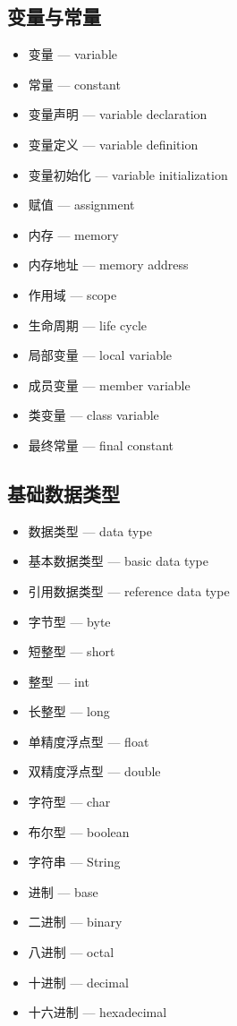 \subsection{变量与常量}
\begin{itemize}
\item 变量 — variable
\item 常量 — constant
\item 变量声明 — variable declaration
\item 变量定义 — variable definition
\item 变量初始化 — variable initialization
\item 赋值 — assignment
\item 内存 — memory
\item 内存地址 — memory address
\item 作用域 — scope
\item 生命周期 — life cycle
\item 局部变量 — local variable
\item 成员变量 — member variable
\item 类变量 — class variable
\item 最终常量 — final constant
\end{itemize}

\subsection{基础数据类型}
\begin{itemize}
\item 数据类型 — data type
\item 基本数据类型 — basic data type
\item 引用数据类型 — reference data type
\item 字节型 — byte
\item 短整型 — short
\item 整型 — int
\item 长整型 — long
\item 单精度浮点型 — float
\item 双精度浮点型 — double
\item 字符型 — char
\item 布尔型 — boolean
\item 字符串 — String
\item 进制 — base
\item 二进制 — binary
\item 八进制 — octal
\item 十进制 — decimal
\item 十六进制 — hexadecimal
\end{itemize}

